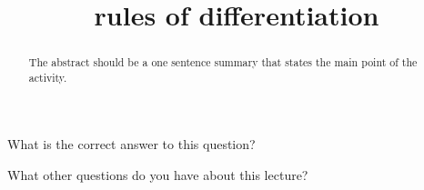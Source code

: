 \documentclass{ximera}
\title{rules of differentiation}
\begin{document}
\begin{abstract}
  The abstract should be a one sentence summary that states the main point of the activity.
\end{abstract}

\maketitle

\begin{question}
  What is the correct answer to this question?

  
    \begin{multipleChoice}
    \end{multipleChoice}  
  
\end{question}

What other questions do you have about this lecture?
\begin{question}
  \begin{freeResponse}
  \end{freeResponse}
\end{question}
\end{document}

